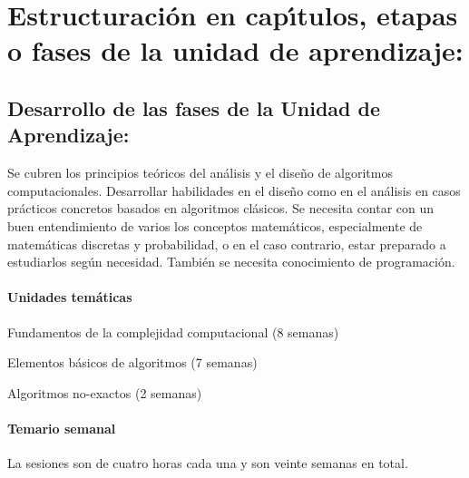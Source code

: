 \section{Estructuraci\'{o}n en cap\'{\i}tulos, etapas o fases de la unidad de
  aprendizaje:}


\subsection{Desarrollo de las fases de la Unidad de Aprendizaje:}

\quad

Se cubren los principios te\'{o}ricos del an\'{a}lisis y el dise\~{n}o
de algoritmos computacionales. Desarrollar habilidades en el
dise\~{n}o como en el an\'{a}lisis en casos pr\'{a}cticos concretos
basados en algoritmos cl\'{a}sicos. Se necesita contar con un buen
entendimiento de varios los conceptos matem\'{a}ticos, especialmente
de matem\'{a}ticas discretas y probabilidad, o en el caso contrario,
estar preparado a estudiarlos seg\'{u}n necesidad. Tambi\'{e}n se
necesita conocimiento de programaci\'{o}n.

\paragraph{Unidades tem\'{a}ticas}

\begin{description}[itemsep=-2pt]
\item[U1]{Fundamentos de la complejidad computacional (8 semanas)}
\item[U2]{Elementos b\'{a}sicos de algoritmos (7 semanas)}
\item[U3]{Algoritmos no-exactos (2 semanas)}
\end{description}

\newpage

\paragraph{Temario semanal}

La sesiones son de cuatro horas cada una y son veinte semanas en
total.

\quad

